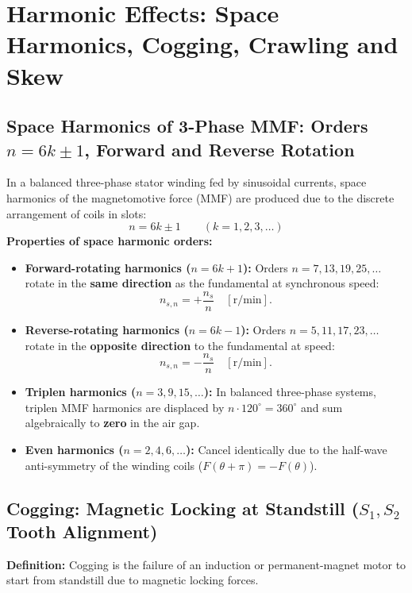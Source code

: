\section{Harmonic Effects: Space Harmonics, Cogging, Crawling and Skew}

\subsection{Space Harmonics of 3-Phase MMF: Orders \texorpdfstring{$n = 6k \pm 1$}{n = 6k +/- 1}, Forward and Reverse Rotation}
In a balanced three-phase stator winding fed by sinusoidal currents, space harmonics of the magnetomotive force (MMF) are produced due to the discrete arrangement of coils in slots:
\begin{equation}
\boxed{n = 6k \pm 1 \qquad (k = 1, 2, 3, \dots)}
\end{equation}
\textbf{Properties of space harmonic orders:}
\begin{itemize}
  \item \textbf{Forward-rotating harmonics ($n = 6k+1$):} Orders $n = 7, 13, 19, 25, \dots$ rotate in the \textbf{same direction} as the fundamental at synchronous speed:
  \begin{equation}
  n_{s,n} = +\frac{n_s}{n} \quad [\mathrm{r/min}].
  \end{equation}
  \item \textbf{Reverse-rotating harmonics ($n = 6k-1$):} Orders $n = 5, 11, 17, 23, \dots$ rotate in the \textbf{opposite direction} to the fundamental at speed:
  \begin{equation}
  n_{s,n} = -\frac{n_s}{n} \quad [\mathrm{r/min}].
  \end{equation}
  \item \textbf{Triplen harmonics ($n = 3, 9, 15, \dots$):} In balanced three-phase systems, triplen MMF harmonics are displaced by $n\cdot 120^\circ = 360^\circ$ and sum algebraically to \textbf{zero} in the air gap.
  \item \textbf{Even harmonics ($n = 2, 4, 6, \dots$):} Cancel identically due to the half-wave anti-symmetry of the winding coils ($F(\theta+\pi) = -F(\theta)$).
\end{itemize}

\subsection{Cogging: Magnetic Locking at Standstill (\texorpdfstring{$S_1, S_2$}{S1, S2} Tooth Alignment)}
\textbf{Definition:} Cogging is the failure of an induction or permanent-magnet motor to start from standstill due to magnetic locking forces.


